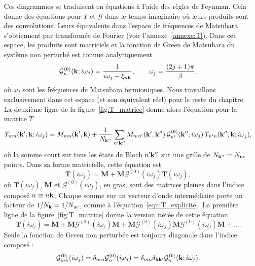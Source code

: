 Ces diagrammes se traduisent en équations à l'aide des règles de Feynman. Cela donne des équations pour $T$ et $\mathcal{G}$ dans le temps imaginaire où leurs produits sont des convolutions. Leurs équivalents dans l'espace de fréquences de Matsubara s'obtiennent par transformée de Fourier (voir l'annexe~\ref{annexe:T}). Dans cet espace, les produits sont matriciels et la fonction de Green de Matsubara du système non perturbé est connue analytiquement
\begin{equation}
    \mathcal{G}^{(0)}_{n}(\mathbf{k};i\omega_j) = \frac{1}{i\omega_j-\xi_{n\mathbf{k}}},\qquad \omega_j = \frac{(2j+1)\pi}{\beta},\label{eqn:G0_chap}
\end{equation}
où $\omega_j$ sont les fréquences de Matsubara fermioniques. Nous travaillons exclusivement dans cet espace (et son équivalent réel) pour le reste du chapitre. La deuxième ligne de la figure~\ref{fig:T_matrice} donne alors l'équation pour la matrice $T$
\begin{equation}
T_{mn}(\mathbf{k}',\mathbf{k};i\omega_j) = M_{mn}(\mathbf{k}',\mathbf{k})+\frac{1}{N_{\mathbf{k}''}}\sum_{n'\mathbf{k}''}M_{mn'}(\mathbf{k}',\mathbf{k}'')\,\mathcal{G}^{(0)}_{n'}(\mathbf{k}'';i\omega_j)\,T_{n'n}(\mathbf{k}'',\mathbf{k};i\omega_j),\label{eqn:T_explicite}
\end{equation}
où la somme court sur tous les états de Bloch $n'\mathbf{k}''$ sur une grille de $N_{\mathbf{k}''}=N_\text{uc}$ points. Dans sa forme matricielle, cette équation est
\begin{equation}
    \bm T(i\omega_j) = \bm M +\bm M \bm{\mathcal{G}}^{(0)}(i\omega_j)\bm T(i\omega_j),\label{eqn:T_chap}
\end{equation}
où $\bm T(i\omega_j)$, $\bm M$ et $\bm{\mathcal{G}}^{(0)}(i\omega_j)$, en gras, sont des matrices pleines dans l'indice composé $n\equiv n\mathbf{k}$. Chaque somme sur un vecteur d'onde intermédiaire porte un facteur de $1/N_{\mathbf{k}}=1/N_\text{uc}$, comme à l'équation~\eqref{eqn:T_explicite}. La première ligne de la figure~\ref{fig:T_matrice} donne la version itérée de cette équation
\begin{equation}
    \bm T(i\omega_j) = \bm M + \bm M \bm{\mathcal{G}}^{(0)}(i\omega_j)\bm M + \bm M \bm{\mathcal{G}}^{(0)}(i\omega_j)\bm M \bm{\mathcal{G}}^{(0)}(i\omega_j)\bm M +\dots .\label{eqn:T_series}
\end{equation}
Seule la fonction de Green non perturbée est toujours diagonale dans l'indice composé :
\begin{equation}
    \mathcal{G}^{(0)}_{mn}(i\omega_j) = \delta_{mn}\mathcal{G}^{(0)}_n(i\omega_j)=\delta_{mn}\delta_{\mathbf{k}\mathbf{k}'}\mathcal{G}^{(0)}_{n}(\mathbf{k};i\omega_j).\label{eqn:G0_bold}
\end{equation}
